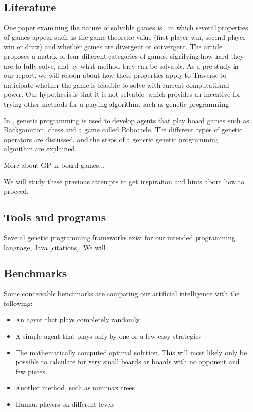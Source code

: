 \documentclass[times, 10pt,twocolumn]{article}
\begin{document}
\subsection{Literature}
One paper examining the nature of solvable games is \cite{games_solved}, in which several properties of games appear such as the game-theoretic value (first-player win, second-player win or draw) and whether games are divergent or convergent. The article proposes a matrix of four different categories of games, signifying how hard they are to fully solve, and by what method they can be solvable. As a pre-study in our report, we will reason about how these properties apply to Traverse to anticipate whether the game is feasible to solve with current computational power. Our hypothesis is that it is not solvable, which provides an incentive for trying other methods for a playing algorithm, such as genetic programming.

In \cite{human-competitive_gp}, genetic programming is used to develop agents that play board games such as Backgammon, chess and a game called Robocode. The different types of genetic operators are discussed, and the steps of a generic genetic programming algorithm are explained.

More about GP in board games...

We will study these previous attempts to get inspiration and hints about how to proceed.

\subsection{Tools and programs}

Several genetic programming frameworks exist for our intended programming language, Java [citations]. We will 

\subsection{Benchmarks}

Some conceivable benchmarks are comparing our artificial intelligence with the following:
\begin{itemize}
	\item{An agent that plays completely randomly}
	\item{A simple agent that plays only by one or a few easy strategies}
	\item{The mathematically computed optimal solution. This will most likely only be possible to calculate for very small boards or boards with no opponent and few pieces.}
	\item{Another method, such as minimax trees}
	\item{Human players on different levels}
\end{itemize}
\end{document}

